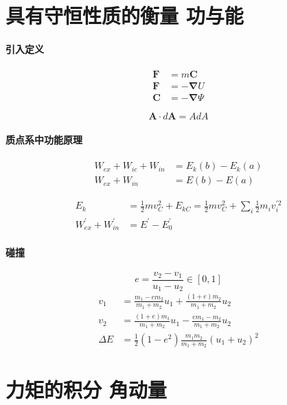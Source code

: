 \documentclass[12pt,a4paper]{article}
\numberwithin{equation}{section}
\begin{document}
\begin{CJK}{UTF8}{gbsn}
\section{具有守恒性质的衡量 功与能}

\paragraph{引入定义}
\begin{align}
\bm{F}&=m\bm{C} \\
\bm{F}&=-\bm{\nabla}U \\
\bm{C}&=-\bm{\nabla} \Psi
\end{align}

\begin{equation}
  \bm{A}\cdot d\bm{A}=AdA
\end{equation}

\paragraph{质点系中功能原理}
\begin{align}
  W_{ex}+W_{ic}+W_{in}&=E_k(b)-E_k(a)\\
  W_{ex}+W_{in}&=E(b)-E(a)
\end{align}

\begin{align}
  E_k &= \frac{1}{2}mv_C^2 +E_{kC} = \frac{1}{2}mv_C^2 + \sum_i \frac{1}{2} m_i v_i^{\prime2} \\
  W_{ex}^{\prime}+W_{in}^{\prime} &=E^{\prime}-E_0^{\prime}
\end{align}

\paragraph{碰撞}
\begin{equation}
  e=\frac{v_2-v_1}{u_1-u_2}\in[0,1]
\end{equation}
\begin{align}
  v_1 &= \frac{m_1-em_2}{m_1+m_2}u_1+\frac{(1+e)m_2}{m_1+m_2}u_2 \\
  v_2 &= \frac{(1+e)m_1}{m_1+m_2}u_1-\frac{em_1-m_2}{m_1+m_2}u_2 \\
  \Delta E&=\frac{1}{2}(1-e^2)\frac{m_1m_2}{m_1+m_2}(u_1+u_2)^2
\end{align}

\section{力矩的积分 角动量}

\end{CJK}
\end{document}
